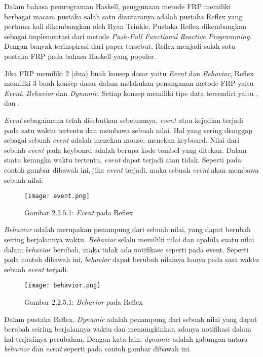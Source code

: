 \documentclass[pi.tex]{subfile}
\begin{document}
Dalam bahasa pemrograman Haskell, penggunaan metode FRP memiliki berbagai macam pustaka salah satu diantaranya adalah pustaka Reflex yang pertama kali dikembangkan oleh Ryan Trinkle. Pustaka Reflex dikembangkan sebagai implementasi dari metode \emph{Push-Pull Functional Reactive Programming}. Dengan banyak terinspirasi dari paper tersebut, Reflex menjadi salah satu pustaka FRP pada bahasa Haskell yang populer.

Jika FRP memiliki 2 (dua) buah konsep dasar yaitu \emph{Event} dan \emph{Behavior}, Reflex memiliki 3 buah konsep dasar dalam melakukan penanganan metode FRP yaitu \emph{Event}, \emph{Behavior} dan \emph{Dynamic}. Setiap konsep memiliki tipe data tersendiri yaitu ,  dan .

\emph{Event} sebagaimana telah disebutkan sebelumnya, \emph{event} atau kejadian terjadi pada satu waktu tertentu dan  membawa sebuah nilai. Hal yang sering dianggap sebagai sebuah \emph{event} adalah menekan mouse, menekan keyboard. Nilai dari sebuah \emph{event} pada keyboard adalah berupa kode tombol yang ditekan. Dalam suatu kerangka waktu tertentu, \emph{event} dapat terjadi atau tidak. Seperti pada contoh gambar dibawah ini, jika \emph{event} terjadi, maka sebuah \emph{event} akan membawa sebuah nilai.

\begin{figure}[H]
  \texttt{[image: event.png]}
  
  {Gambar 2.2.5.1: \emph{Event} pada Reflex}
  \centering
\end{figure}

\emph{Behavior} adalah merupakan penampung dari sebuah nilai, yang dapat berubah seiring berjalannya waktu. \emph{Behavior} selalu memiliki nilai dan apabila suatu nilai dalam \emph{behavior} berubah, maka tidak ada notifikase seperti pada event. Seperti pada contoh dibawah ini, \emph{behavior} dapat berubah nilainya hanya pada saat waktu sebuah \emph{event} terjadi.

\begin{figure}[H]
  \texttt{[image: behavior.png]}
  
  {Gambar 2.2.5.1: \emph{Behavior} pada Reflex}
  \centering
\end{figure}


Dalam pustaka Reflex, \emph{Dynamic} adalah penampung dari sebuah nilai yang dapat berubah seiring berjalannya waktu dan memungkinkan adanya notifikasi dalam hal terjadinya perubahan. Dengan kata lain, \emph{dynamic} adalah gabungan antara \emph{behavior} dan \emph{event} seperti pada contoh gambar dibawah ini.
\end{document}
